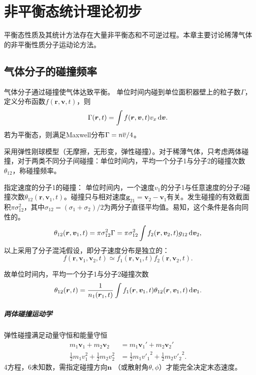 \newcommand*{\df}{\mathrm d}
\newcommand*{\cll}{\mathrm c}

\chapter{非平衡态统计理论初步}

平衡态性质及其统计方法存在大量非平衡态和不可逆过程。本章主要讨论稀薄气体的非平衡性质分子运动论方法。

\section{气体分子的碰撞频率}

气体分子通过碰撞使气体达致平衡。
单位时间内碰到单位面积器壁上的粒子数$\Gamma$，定义分布函数$f(\bm r,\bm v,t)$，则
\[
	\Gamma(\bm r,t)=\int f(\bm r,\bm v,t)v_x\mathop{}\!\mathrm{d}\bm v.
\]
若为平衡态，则满足Maxwell分布$\Gamma=n\overline{v}/4$。

采用弹性刚球模型（无摩擦，无形变，弹性碰撞）。对于稀薄气体，只考虑两体碰撞，对于两类不同分子间碰撞：单位时间内，平均一个分子1与分子2的碰撞次数$\theta_{12}$，称碰撞频率。

指定速度的分子1的碰撞：
单位时间内，一个速度$v_1$的分子1与任意速度的分子2碰撞次数$\theta_{12}(\bm r,\bm v_1,t)$。碰撞只与相对速度$\bm g_{21}=\bm v_2-\bm v_1$有关。发生碰撞的有效截面积$\pi\sigma^2_{12}$，其中$\sigma_{12}=(\sigma_1+\sigma_2)/2$为两分子直径平均值。易知，这个条件是各向同性的。
\begin{align}
	\theta_{12}(\bm r,\bm v_1,t)=\pi\sigma_{12}^2\Gamma=\pi\sigma_{12}^2\int f_2(\bm r,\bm v_2,t)g_{12}\mathop{}\!\mathrm{d}\bm v_2,
\end{align}
以上采用了分子混沌假设，即分子速度分布是独立的：
\[
	f(\bm r,\bm v_1,\bm v_2,t)\simeq f_1(\bm r,\bm v_1,t)f_2(\bm r,\bm v_2,t).
\]

故单位时间内，平均一个分子1与分子2碰撞次数
\begin{align}
	\theta_{12}(\bm r,t)=\frac1{n_1(\bm r_1,t)}\int f_1(\bm r,\bm v_1,t)\theta_{12}(\bm r,\bm v_1,t)\mathop{}\!\mathrm{d}\bm v_1.
\end{align}
\paragraph{两体碰撞运动学}
弹性碰撞满足动量守恒和能量守恒
\begin{align}
	m_1\bm v_1+m_2\bm v_2&=m_1\bm v_1'+m_2\bm v_2'\\
	\frac12m_1v_1^2+\frac12m_2v_2^2&=\frac12m_1{v'_1}^2+\frac12m_2{v'_2}^2.
\end{align}
4方程，6未知数，需指定碰撞方向$\bm n$ （或散射角$\theta,\phi$）才能完全决定末态速度。

